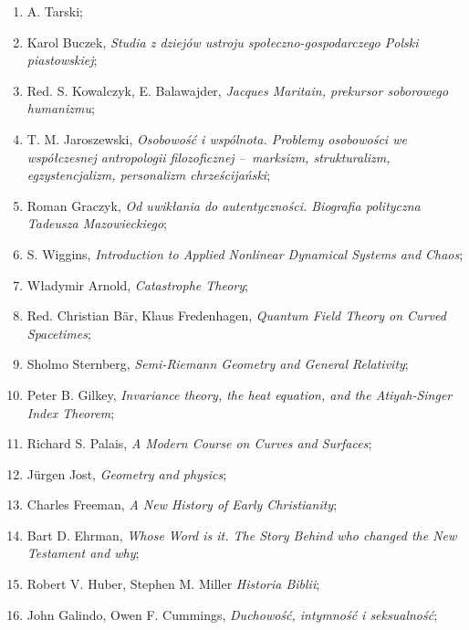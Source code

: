 \documentclass[a4paper,11pt]{article}
\begin{document}
\begin{enumerate}
\item A. Tarski;

\item Karol Buczek, \emph{Studia z dziejów ustroju
    społeczno-gospodarczego Polski piastowskiej};

\item Red. S. Kowalczyk, E. Balawajder, \emph{Jacques Maritain,
    prekursor soborowego humanizmu};

\item T. M. Jaroszewski, \emph{Osobowość i wspólnota. Problemy
    osobowości we współczesnej antropologii filozoficznej --~marksizm,
    strukturalizm, egzystencjalizm, personalizm chrześcijański};

\item Roman Graczyk, \emph{Od uwikłania do autentyczności. Biografia
    polityczna Tadeusza Mazowieckiego};

\item S. Wiggins, \emph{Introduction to Applied Nonlinear Dynamical
    Systems and Chaos};

\item Władymir Arnold, \emph{Catastrophe Theory};

\item Red. Christian B\"{a}r, Klaus Fredenhagen, \emph{Quantum Field
    Theory on Curved Spacetimes};

\item Sholmo Sternberg, \emph{Semi-Riemann Geometry and General
    Relativity};

\item Peter B. Gilkey, \emph{Invariance theory, the heat equation, and
    the Atiyah-Singer Index Theorem};

\item Richard S. Palais, \emph{A Modern Course on Curves and
    Surfaces};

\item J\"{u}rgen Jost, \emph{Geometry and physics};

\item Charles Freeman, \emph{A New History of Early Christianity};

\item Bart D. Ehrman, \emph{Whose Word is it. The Story Behind who
    changed the New Testament and why};

\item Robert V. Huber, Stephen M. Miller \emph{Historia Biblii};

\item John Galindo, Owen F. Cummings, \emph{Duchowość, intymność i
    seksualność};


\end{enumerate}
\end{document}
